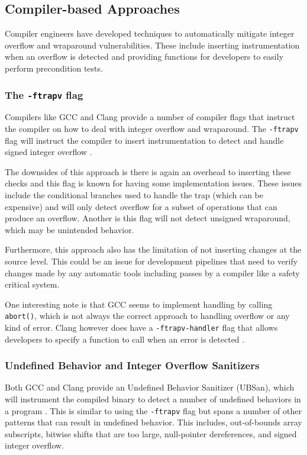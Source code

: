 \subsection{Compiler-based Approaches}

Compiler engineers have developed techniques to automatically mitigate integer overflow and wraparound vulnerabilities. These include inserting instrumentation when an overflow is detected and providing functions for developers to easily perform precondition tests.

\subsubsection{The \texttt{-ftrapv} flag}

Compilers like GCC and Clang provide a number of compiler flags that instruct the compiler on how to deal with integer overflow and wraparound. The \texttt{-ftrapv} flag will instruct the compiler to insert instrumentation to detect and handle signed integer overflow \cite{ftrapv}.

The downsides of this approach is there is again an overhead to inserting these checks and this flag is known for having some implementation issues. These issues include the conditional branches used to handle the trap (which can be expensive) and will only detect overflow for a subset of operations that can produce an overflow. Another is this flag will not detect unsigned wraparound, which may be unintended behavior.

Furthermore, this approach also has the limitation of not inserting changes at the source level. This could be an issue for development pipelines that need to verify changes made by any automatic tools including passes by a compiler like a safety critical system.

One interesting note is that GCC seems to implement handling by calling \texttt{abort()}, which is not always the correct approach to handling overflow or any kind of error. Clang however does have a \texttt{-ftrapv-handler} flag that allows developers to specify a function to call when an error is detected \cite{clang-ftrapv}.

\subsubsection{Undefined Behavior and Integer Overflow Sanitizers}

Both GCC and Clang provide an Undefined Behavior Sanitizer (UBSan), which will instrument the compiled binary to detect a number of undefined behaviors in a program \cite{gcc-ubsan}\cite{clang-ubsan}. This is similar to using the \texttt{-ftrapv} flag but spans a number of other patterns that can result in undefined behavior. This includes, out-of-bounds array subscripts, bitwise shifts that are too large, null-pointer dereferences, and signed integer overflow.

